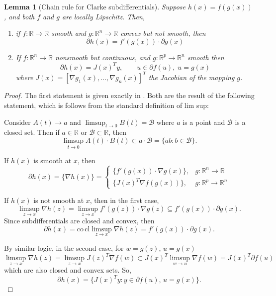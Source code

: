 \documentclass{article}
\newtheorem{lemma}{Lemma}
\newcommand{\R}{\mathbb{R}}
\begin{document}
\begin{lemma}[Chain rule for Clarke subdifferentials]
\label{lem:clarkesubdiffchainrule}
Suppose $h(x) = f(g(x))$, and both $f$ and $g$ are locally Lipschitz. Then, 
\begin{enumerate}
    \item if $f:\R\to\R$ smooth and $g:\R^n\to \R$ convex but not smooth, then 
    \[
    \partial h(x) = f'(g(x)) \cdot \partial g(x)
    \]
    \item If $f:\R^n\to \R$ nonsmooth but continuous,  and $g:\R^p\to\R^n$ smooth
    then
    \[
    \partial h(x) = J(x)^Ty, \qquad u\in \partial f(u), \; u = g(x)
    \]
   where $J(x) = [\nabla g_1(x),...,\nabla g_n(x)]^T$ the Jacobian of the mapping $g$.
\end{enumerate}  
\end{lemma}
\begin{proof}
The first statement is given exactly in \cite{clarke1998nonsmooth}. Both are the result of the following statement, which is follows from the standard definition of lim sup:

    Consider $A(t) \to a$ and $\limsup_{t\to 0} B(t) = \mathcal B$ where $a$ is a point and $\mathcal B$ is a closed set.
    Then if $a\in \R$ or $\mathcal B\subset \R$, then
    \[
    \limsup_{t\to 0} A(t)\cdot B(t) \subset a\cdot \mathcal B = \{ab : b\in \mathcal B\}.
    \]
    
    If $h(x)$ is smooth at $x$, then 
   \[
   \partial h(x) = \{\nabla h(x)\} = \begin{cases}
   \{f'(g(x))\cdot \nabla g(x)\}, & g:\R^n\to\R\\
       \{J(x)^T \nabla f(g(x))\}, & g:\R^p\to \R^n
   \end{cases}
   \]

   If $h(x)$ is not smooth at $x$, then   in the first case, 
\[
\limsup_{z\to x} \nabla h(z) = \limsup_{z\to x}  f'(g(z))\cdot \nabla g(z) \subseteq  f'(g(x)) \cdot \partial g(x).
\]
Since subdifferentials are closed and convex, then 
\[
\partial h(x)  = \mathrm{co\,cl}\limsup_{z\to x} \nabla h(z) = f'(g(x)) \cdot \partial g(x).  
\]

By similar logic, in the second case, for $w = g(z)$, $u = g(x)$
  \[
\limsup_{z\to x} \nabla h(z) = \limsup_{z\to x}  J(z)^T\nabla f(w) \subset J(x)^T \limsup_{w\to u}   \nabla f(w) = J(x)^T\partial f(u)
\] 
which are also closed and convex sets. So, 
\[
\partial h(x)  = \{J(x)^Ty : y\in\partial f(u),\,u=g(x)\}.
\]
\end{proof}
\end{document}
